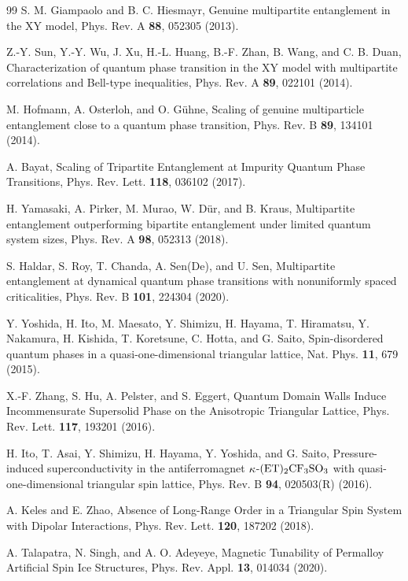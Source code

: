 \documentclass[pra,aps,twocolumn,showpacs]{revtex4}
\begin{document}
\begin{thebibliography}{99}
	S. M. Giampaolo and B. C. Hiesmayr, Genuine multipartite entanglement in the XY model, Phys. Rev. A \textbf{88}, 052305 (2013).
	

   Z.-Y. Sun, Y.-Y. Wu, J. Xu, H.-L. Huang, B.-F. Zhan, B. Wang, and C. B. Duan, Characterization of quantum phase transition in the XY model with multipartite correlations and Bell-type inequalities, Phys. Rev. A \textbf{89}, 022101 (2014).

	M. Hofmann, A. Osterloh, and O. G\"uhne, Scaling of genuine multiparticle entanglement close to a quantum phase transition, Phys. Rev. B \textbf{89}, 134101 (2014).

 A. Bayat, Scaling of Tripartite Entanglement at Impurity Quantum Phase Transitions, Phys. Rev. Lett. \textbf{118}, 036102 (2017).

 H. Yamasaki, A. Pirker, M. Murao, W. D\"ur, and B. Kraus, Multipartite entanglement outperforming bipartite entanglement under limited quantum system sizes, Phys. Rev. A \textbf{98}, 052313 (2018).

	S. Haldar, S. Roy, T. Chanda, A. Sen(De), and U. Sen, Multipartite entanglement at dynamical quantum phase transitions with nonuniformly spaced criticalities, Phys. Rev. B \textbf{101}, 224304 (2020).

	Y. Yoshida, H. Ito, M. Maesato, Y. Shimizu, H. Hayama, T. Hiramatsu, Y. Nakamura, H. Kishida, T. Koretsune, C. Hotta, and G. Saito, Spin-disordered quantum phases in a quasi-one-dimensional triangular lattice, Nat. Phys. \textbf{11}, 679 (2015).
	
	X.-F. Zhang, S. Hu, A. Pelster, and S. Eggert, Quantum Domain Walls Induce Incommensurate Supersolid Phase on the Anisotropic Triangular Lattice, Phys. Rev. Lett. \textbf{117}, 193201 (2016).

 H. Ito, T. Asai, Y. Shimizu, H. Hayama, Y. Yoshida, and G. Saito, Pressure-induced superconductivity in the antiferromagnet $\rm \kappa$-$\rm (ET)_2CF_3SO_3$ with
quasi-one-dimensional triangular spin lattice, Phys. Rev. B \textbf{94}, 020503(R) (2016).
	
	A. Keles and E. Zhao, Absence of Long-Range Order in a Triangular Spin System with Dipolar Interactions, Phys. Rev. Lett. \textbf{120}, 187202 (2018).
	
	A. Talapatra, N. Singh, and A. O. Adeyeye, Magnetic Tunability of Permalloy Artificial Spin Ice Structures, Phys. Rev. Appl. \textbf{13}, 014034 (2020).


\end{thebibliography}
\end{document}
